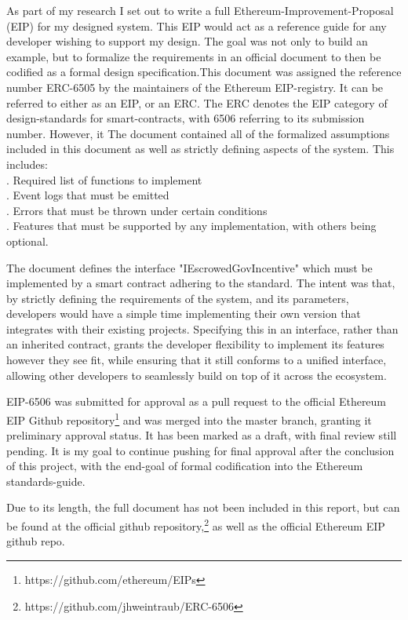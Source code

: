 \documentclass{article}
\begin{document}
As part of my research I set out to write a full Ethereum-Improvement-Proposal (EIP) for my designed system. This EIP would act as a reference guide for any developer wishing to support my design. The goal was not only to build an example, but to formalize the requirements in an official document to then be codified as a formal design specification.This document was assigned the reference number ERC-6505 by the maintainers of the Ethereum EIP-registry. It can be referred to either as an EIP, or an ERC. The ERC denotes the EIP category of design-standards for smart-contracts, with 6506 referring to its submission number. However, it The document contained all of the formalized assumptions included in this document as well as strictly defining aspects of the system. This includes:\\
. Required list of functions to implement\\
. Event logs that must be emitted\\
. Errors that must be thrown under certain conditions\\
. Features that must be supported by any implementation, with others being optional.

The document defines the interface "IEscrowedGovIncentive" which must be implemented by a smart contract adhering to the standard. The intent was that, by strictly defining the requirements of the system, and its parameters, developers would have a simple time implementing their own version that integrates with their existing projects. Specifying this in an interface, rather than an inherited contract, grants the developer flexibility to implement its features however they see fit, while ensuring that it still conforms to a unified interface, allowing other developers to seamlessly build on top of it across the ecosystem.

EIP-6506 was submitted for approval as a pull request to the official Ethereum EIP Github repository\footnote{https://github.com/ethereum/EIPs} and was merged into the master branch, granting it preliminary approval status. It has been marked as a draft, with final review still pending. It is my goal to continue pushing for final approval after the conclusion of this project, with the end-goal of formal codification into the Ethereum standards-guide.

Due to its length, the full document has not been included in this report, but can be found at the official github repository,\footnote{https://github.com/jhweintraub/ERC-6506} as well as the official Ethereum EIP github repo.
\end{document}
